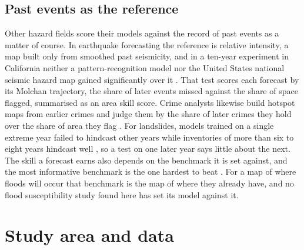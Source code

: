 \documentclass[10pt,a4paper,twocolumn]{article}
\begin{document}
\subsection{Past events as the reference}
\label{sec:reference}

Other hazard fields score their models against the record of past events as a matter of course. In earthquake forecasting the reference is relative intensity, a map built only from smoothed past seismicity, and in a ten-year experiment in California neither a pattern-recognition model nor the United States national seismic hazard map gained significantly over it \citep{zechar2008}. That test scores each forecast by its Molchan trajectory, the share of later events missed against the share of space flagged, summarised as an area skill score. Crime analysts likewise build hotspot maps from earlier crimes and judge them by the share of later crimes they hold over the share of area they flag \citep{chainey2008}. For landslides, models trained on a single extreme year failed to hindcast other years while inventories of more than six to eight years hindcast well \citep{jones2021}, so a test on one later year says little about the next. The skill a forecast earns also depends on the benchmark it is set against, and the most informative benchmark is the one hardest to beat \citep{pappenberger2015}. For a map of where floods will occur that benchmark is the map of where they already have, and no flood susceptibility study found here has set its model against it.

\section{Study area and data}
\end{document}
